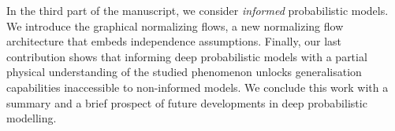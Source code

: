 In the third part of the manuscript, we consider \textit{informed} probabilistic models. We introduce the graphical normalizing flows, a new normalizing flow architecture that embeds independence assumptions. Finally, our last contribution shows that informing deep probabilistic models with a partial physical understanding of the studied phenomenon unlocks generalisation capabilities inaccessible to non-informed models. We conclude this work with a summary and a brief prospect of future developments in deep probabilistic modelling.
